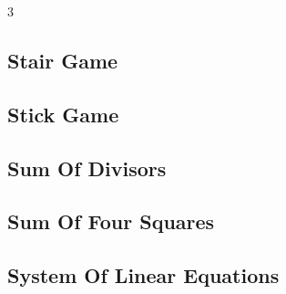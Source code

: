 \documentclass[8pt]{extarticle}
\begin{document}
\begin{multicols*}{3}
\subsection{Stair Game}
\begin{caixaenunciado}

\end{caixaenunciado}
\vspace{0.3cm}


\subsection{Stick Game}
\begin{caixaenunciado}

\end{caixaenunciado}
\vspace{0.3cm}


\subsection{Sum Of Divisors}
\begin{caixaenunciado}

\end{caixaenunciado}
\vspace{0.3cm}


\subsection{Sum Of Four Squares}
\begin{caixaenunciado}

\end{caixaenunciado}
\vspace{0.3cm}


\subsection{System Of Linear Equations}
\begin{caixaenunciado}

\end{caixaenunciado}
\vspace{0.3cm}



\end{multicols*}
\end{document}
